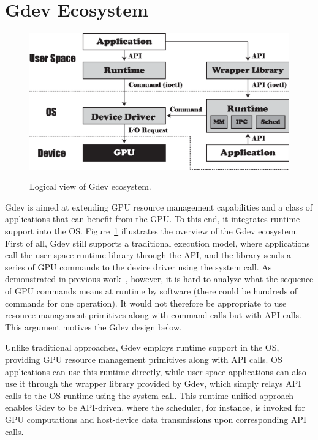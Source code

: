 \section{Gdev Ecosystem}
\label{sec:ecosystem}

\begin{figure}[t]
 \begin{center}
  \includegraphics[width=0.93\hsize]{eps/gdev.eps}\\
  \vspace{-0.5em}
  \caption{Logical view of Gdev ecosystem.}
  \label{fig:gdev}
 \end{center}
 \vspace{-1.5em}
\end{figure}

Gdev is aimed at extending GPU resource management capabilities and a
class of applications that can benefit from the GPU.
To this end, it integrates runtime support into the OS.
Figure~\ref{fig:gdev} illustrates the overview of the Gdev ecosystem.
First of all, Gdev still supports a traditional execution model, where
applications call the user-space runtime library through the API, and
the library sends a series of GPU commands to the device driver using
the system call.
As demonstrated in previous work~\cite{Kato_ATC11}, however, it is hard
to analyze what the sequence of GPU commands means at runtime by
software (there could be hundreds of commands for one operation).
It would not therefore be appropriate to use resource management
primitives along with command calls but with API calls.
This argument motives the Gdev design below.

Unlike traditional approaches, Gdev employs runtime support in
the OS, providing GPU resource management primitives along with API calls.
OS applications can use this runtime directly, while user-space
applications can also use it through the wrapper library provided by
Gdev, which simply relays API calls to the OS runtime using the system
call.
This runtime-unified approach enables Gdev to be API-driven, where the
scheduler, for instance, is invoked for GPU computations and host-device
data transmissions upon corresponding API calls.

